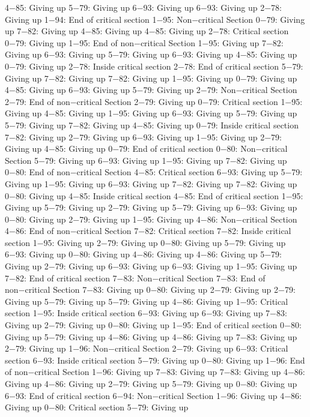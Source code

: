4−85: Giving up
5−79: Giving up
6−93: Giving up
6−93: Giving up
2−78: Giving up
1−94: End of critical section
1−95: Non−critical Section
0−79: Giving up
7−82: Giving up
4−85: Giving up
4−85: Giving up
2−78: Critical section
0−79: Giving up
1−95: End of non−critical Section
1−95: Giving up
7−82: Giving up
6−93: Giving up
5−79: Giving up
6−93: Giving up
4−85: Giving up
0−79: Giving up
2−78: Inside critical section
2−78: End of critical section
5−79: Giving up
7−82: Giving up
7−82: Giving up
1−95: Giving up
0−79: Giving up
4−85: Giving up
6−93: Giving up
5−79: Giving up
2−79: Non−critical Section
2−79: End of non−critical Section
2−79: Giving up
0−79: Critical section
1−95: Giving up
4−85: Giving up
1−95: Giving up
6−93: Giving up
5−79: Giving up
5−79: Giving up
7−82: Giving up
4−85: Giving up
0−79: Inside critical section
7−82: Giving up
2−79: Giving up
6−93: Giving up
1−95: Giving up
2−79: Giving up
4−85: Giving up
0−79: End of critical section
0−80: Non−critical Section
5−79: Giving up
6−93: Giving up
1−95: Giving up
7−82: Giving up
0−80: End of non−critical Section
4−85: Critical section
6−93: Giving up
5−79: Giving up
1−95: Giving up
6−93: Giving up
7−82: Giving up
7−82: Giving up
0−80: Giving up
4−85: Inside critical section
4−85: End of critical section
1−95: Giving up
5−79: Giving up
2−79: Giving up
5−79: Giving up
6−93: Giving up
0−80: Giving up
2−79: Giving up
1−95: Giving up
4−86: Non−critical Section
4−86: End of non−critical Section
7−82: Critical section
7−82: Inside critical section
1−95: Giving up
2−79: Giving up
0−80: Giving up
5−79: Giving up
6−93: Giving up
0−80: Giving up
4−86: Giving up
4−86: Giving up
5−79: Giving up
2−79: Giving up
6−93: Giving up
6−93: Giving up
1−95: Giving up
7−82: End of critical section
7−83: Non−critical Section
7−83: End of non−critical Section
7−83: Giving up
0−80: Giving up
2−79: Giving up
2−79: Giving up
5−79: Giving up
5−79: Giving up
4−86: Giving up
1−95: Critical section
1−95: Inside critical section
6−93: Giving up
6−93: Giving up
7−83: Giving up
2−79: Giving up
0−80: Giving up
1−95: End of critical section
0−80: Giving up
5−79: Giving up
4−86: Giving up
4−86: Giving up
7−83: Giving up
2−79: Giving up
1−96: Non−critical Section
2−79: Giving up
6−93: Critical section
6−93: Inside critical section
5−79: Giving up
0−80: Giving up
1−96: End of non−critical Section
1−96: Giving up
7−83: Giving up
7−83: Giving up
4−86: Giving up
4−86: Giving up
2−79: Giving up
5−79: Giving up
0−80: Giving up
6−93: End of critical section
6−94: Non−critical Section
1−96: Giving up
4−86: Giving up
0−80: Critical section
5−79: Giving up
